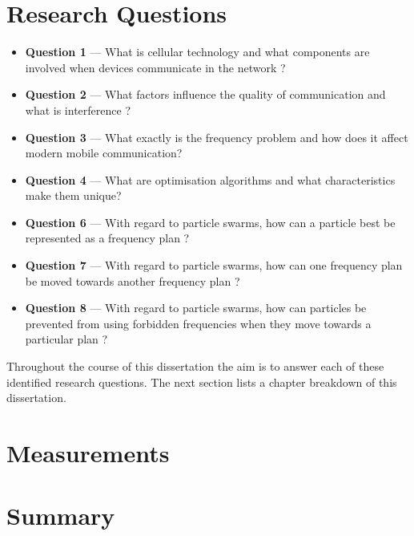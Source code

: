 \section{Research Questions}
\begin{itemize}
\item \textbf{Question 1} --- What is cellular technology and what components are involved when devices communicate in the network ?
\item \textbf{Question 2} --- What factors influence the quality of communication and what is interference ?
\item \textbf{Question 3} --- What exactly is the frequency problem and how does it affect modern mobile communication?
\item \textbf{Question 4} --- What are optimisation algorithms and what characteristics make them unique?
\item \textbf{Question 6} --- With regard to particle swarms, how can a particle best be represented as a frequency plan ?
\item \textbf{Question 7} --- With regard to particle swarms, how can one frequency plan be moved towards another frequency plan ?
\item \textbf{Question 8} --- With regard to particle swarms, how can particles be prevented from using forbidden frequencies when they move towards a particular plan ?
\end{itemize}

Throughout the course of this dissertation the aim is to answer each of these identified research questions. The next section lists a chapter breakdown of this dissertation.

\section{Measurements}
\section{Summary}

